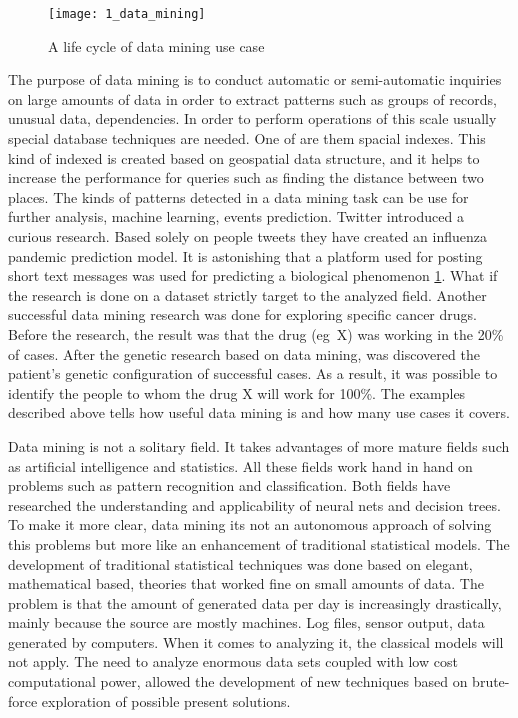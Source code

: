\begin{figure}[!ht]
\centering
\texttt{[image: 1\_data\_mining]}
\caption{A life cycle of data mining use case}\label{data_mining}
\end{figure}

The purpose of data mining is to conduct automatic or semi-automatic inquiries on large amounts of data in order to extract patterns such as groups of records, unusual data, dependencies. In order to perform operations of this scale usually special database techniques are needed. One of are them spacial indexes. This kind of indexed is created based on geospatial data structure, and it helps to increase the performance for queries such as finding the distance between two places. The kinds of patterns detected in a data mining task can be use for further analysis, machine learning, events prediction. Twitter introduced a curious research. Based solely on people tweets they have created an influenza pandemic prediction model. It is astonishing that a platform used for posting short text messages was used for predicting a biological phenomenon \mbox{\ref{data_mining}}. What if the research is done on a dataset strictly target to the analyzed field. Another successful data mining research was done for exploring specific cancer drugs. Before the research, the result was that the drug \mbox{(eg X)} was working in the 20\% of cases. After the genetic research based on data mining, was discovered the patient's genetic configuration of successful cases. As a result, it was possible to identify the people to whom the drug X will work for 100\%. The examples described above tells how useful data mining is and how many use cases it covers.

Data mining is not a solitary field. It takes advantages of more mature fields such as artificial intelligence and statistics. All these fields work hand in hand on problems such as pattern recognition and classification. Both fields have researched the understanding and applicability of neural nets and decision trees. To make it more clear, data mining its not an autonomous approach of solving this problems but more like an enhancement of traditional statistical models. The development of traditional statistical techniques was done based on elegant, mathematical based, theories that worked fine on small amounts of data. The problem is that the amount of generated data per day is increasingly drastically, mainly because the source are mostly machines. Log files, sensor output, data generated by computers. When it comes to analyzing it, the classical models will not apply. The need to analyze enormous data sets coupled with low cost computational power, allowed the development of new techniques based on brute-force exploration of possible present solutions.


